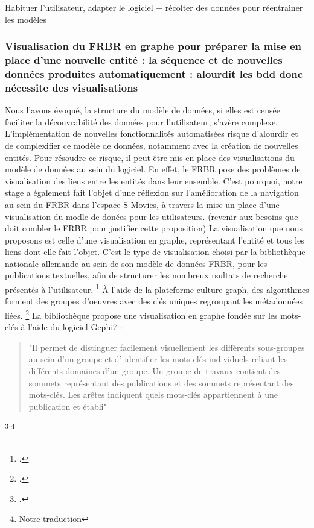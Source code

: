 Habituer l'utilisateur, adapter le logiciel + récolter des données pour réentrainer les modèles 

\subsubsection{Visualisation du FRBR en graphe pour préparer la mise en place d’une nouvelle entité : la séquence et de nouvelles données produites automatiquement : alourdit les bdd donc nécessite des visualisations}

Nous l'avons évoqué, la structure du modèle de données, si elles est censée faciliter la découvrabilité des données pour l'utilisateur, s'avère complexe. L'implémentation de nouvelles fonctionnalités automatisées risque d'alourdir et de complexifier ce modèle de données, notamment avec la création de nouvelles entités. Pour résoudre ce risque, il peut être mis en place des visualisations du modèle de données au sein du logiciel. En effet, le FRBR pose des problèmes de visualisation des liens entre les entités dans leur ensemble. C'est pourquoi, notre stage a également fait l'objet d'une réflexion sur l'amélioration de la navigation au sein du FRBR dans l'espace S-Movies, à travers la mise un place d'une visualisation du modle de donées pour les utilisateurs.
(revenir aux besoins que doit combler le FRBR pour justifier cette proposition)
La visualisation que nous proposons est celle d'une visualisation en graphe, représentant l'entité et tous les liens dont elle fait l'objet.
C'est le type de visualisation choisi par la bibliothèque nationale allemande au sein de son modèle de données FRBR, pour les publications textuelles, afin de structurer les nombreux rsultats de recherche présentés à l'utilisateur. \footcite{zotero-item-749}
À l'aide de la plateforme culture graph, des algorithmes forment des groupes d'oeuvres avec des clés uniques regroupant les métadonnées liées. \footcite{zotero-item-749} La bibliothèque propose une visualisation en graphe fondée sur les mots-clés à l'aide du logiciel Gephi7 : 
\begin{quote}
	"Il permet de distinguer facilement visuellement les différents sous-groupes au sein d’un groupe et d’
	identifier les mots-clés individuels reliant les différents domaines d’un groupe. Un groupe de travaux contient des sommets
	représentant des publications et des sommets représentant des mots-clés. Les arêtes indiquent quels mots-clés appartiennent
	à une publication et établi"
\end{quote} \footcite{zotero-item-749} \footnote{Notre traduction}

